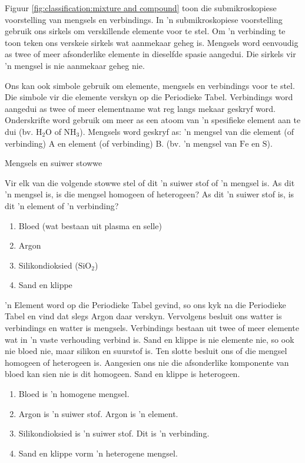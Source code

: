 \label{m38708*eip-487} Figuur \ref{fig:classification:mixture and compound} toon die submikroskopiese voorstelling van mengsels en verbindings. In 'n submikroskopiese voorstelling gebruik ons sirkels om verskillende elemente voor te stel. Om 'n verbinding te toon teken ons verskeie sirkels wat aanmekaar geheg is. Mengsels word eenvoudig as twee of meer afsonderlike elemente in dieselfde spasie aangedui. Die sirkels vir 'n mengsel is nie aanmekaar geheg nie.\par 
\label{m38708*id0124}Ons kan ook simbole gebruik om elemente, mengsels en verbindings voor te stel. Die simbole vir die elemente verskyn op die Periodieke Tabel. Verbindings word aangedui as twee of meer elementname wat reg langs mekaar geskryf word. Onderskrifte word gebruik om meer as een atoom van 'n spesifieke element aan te dui (bv. $\text{H}{}_{2}\text{O}$ of $\text{NH}_{3}$). Mengsels word geskryf as: 'n mengsel van die element (of verbinding) A en element (of verbinding) B. (bv. 'n mengsel van $\text{Fe}$ en $\text{S}$).\par 
\label{m38708*eip-524}
      \begin{wex}
{Mengsels en suiwer stowwe}
{Vir elk van die volgende stowwe stel of dit 'n suiwer stof of 'n mengsel is. As dit 'n mengsel is, is die mengsel homogeen of heterogeen? As dit 'n suiwer stof is, is dit 'n element of 'n verbinding?
\label{m38708*eip-id1167351497334}\begin{enumerate}[noitemsep, label=\textbf{\alph*}. ] 
\item Bloed (wat bestaan uit plasma en selle)
\item Argon
\item Silikondioksied ($\text{SiO}{}_{2}$)
\item Sand en klippe
\end{enumerate}
  }
{
 'n Element word op die Periodieke Tabel gevind, so ons kyk na die Periodieke Tabel en vind dat slegs Argon daar verskyn. Vervolgens besluit ons watter is verbindings en watter is mengsels. Verbindings bestaan uit twee of meer elemente wat in 'n vaste verhouding verbind is. Sand en klippe is nie elemente nie, so ook nie bloed nie, maar silikon en suurstof is. Ten slotte besluit ons of die mengsel homogeen of heterogeen is. Aangesien ons nie die afsonderlike komponente van bloed kan sien nie is dit homogeen. Sand en klippe is heterogeen.
{}
\begin{enumerate}
[noitemsep, label=\textbf{\alph*}. ]
\item Bloed is 'n homogene mengsel.
\item Argon is 'n suiwer stof. Argon is 'n element.
\item Silikondioksied is 'n suiwer stof. Dit is 'n verbinding.
\item Sand en klippe vorm 'n heterogene mengsel.
\end{enumerate}}
    \end{wex}


